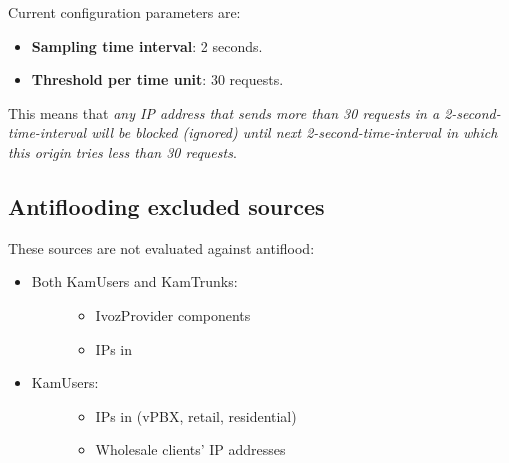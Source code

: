 \documentclass[letterpaper,10pt,english]{sphinxmanual}
\begin{document}
Current configuration parameters are:
\begin{itemize}
\item {} 
\textbf{Sampling time interval}: 2 seconds.

\item {} 
\textbf{Threshold per time unit}: 30 requests.

\end{itemize}

This means that \emph{any IP address that sends more than 30 requests in a 2-second-time-interval will be blocked (ignored)
until next 2-second-time-interval in which this origin tries less than 30 requests}.


\subsection{Antiflooding excluded sources}
\label{security_and_maintenance/security/antiflooding:antiflooding-excluded-sources}
These sources are not evaluated against antiflood:
\begin{itemize}
\item {} \begin{description}
\item[{Both KamUsers and KamTrunks:}] \leavevmode\begin{itemize}
\item {} 
IvozProvider components

\item {} 
IPs in {\hyperref[administration_portal/platform/antiflood_trusted_ips:antiflood\string-trusted\string-ips]{}}

\end{itemize}

\end{description}

\item {} \begin{description}
\item[{KamUsers:}] \leavevmode\begin{itemize}
\item {} 
IPs in {\hyperref[security_and_maintenance/security/authorized_ip_ranges:client\string-authorized\string-ip\string-ranges]{}} (vPBX, retail, residential)

\item {} 
Wholesale clients' IP addresses

\end{itemize}

\end{description}

\end{itemize}
\end{document}
